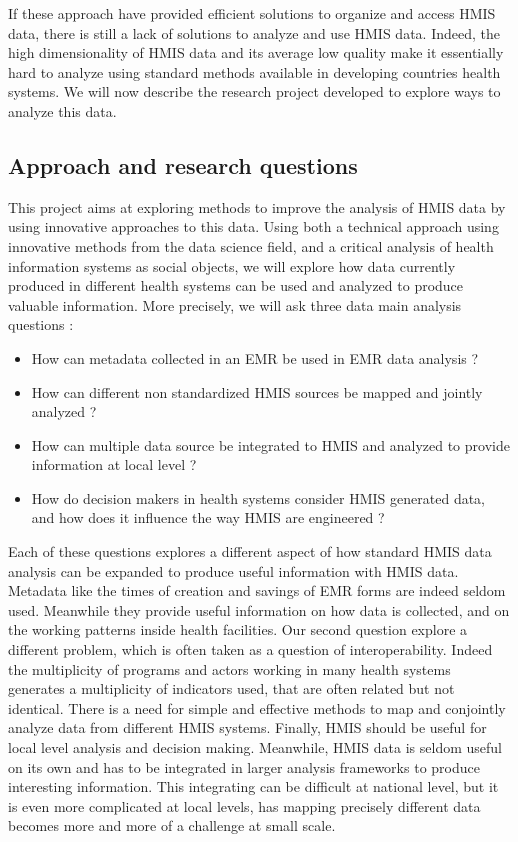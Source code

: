 \documentclass[a4paper,11pt,draft,twoside]{article}
\begin{document}
If these approach have provided efficient solutions to organize and access HMIS data, there is still a lack of solutions to analyze and use HMIS data. Indeed, the high dimensionality of HMIS data and its average low quality make it essentially hard to analyze using standard methods available in developing countries health systems. We will now describe the research project developed to explore ways to analyze this data.


\subsection{Approach and research questions}


This project aims at exploring methods to improve the analysis of HMIS data by using innovative approaches to this data. Using both a technical approach using innovative methods from the data science field, and a critical analysis of health information systems as social objects, we will explore how data currently produced in different health systems can be used and analyzed to produce valuable information. More precisely, we will ask three data main analysis questions :
\begin{itemize}
\item How can metadata collected in an EMR be used in EMR data analysis ?
\item How can different non standardized HMIS sources be mapped and jointly analyzed ?
\item How can multiple data source be integrated to HMIS and analyzed to provide information at local level ?
\item How do decision makers in health systems consider HMIS generated data, and how does it influence the way HMIS are engineered ?
\end{itemize}

Each of these questions explores a different aspect of how standard HMIS data analysis can be expanded to produce useful information with HMIS data. Metadata like the times of creation and savings of EMR forms are indeed seldom used. Meanwhile they provide useful information on how data is collected, and on the working patterns inside health facilities. Our second question explore a different problem, which is often taken as a question of interoperability. Indeed the multiplicity of programs and actors working in many health systems generates a multiplicity of indicators used, that are often related but not identical. There is a need for simple and effective methods to map and conjointly analyze data from different HMIS systems. Finally, HMIS should be useful for local level analysis and decision making. Meanwhile, HMIS data is seldom useful on its own and has to be integrated in larger analysis frameworks to produce interesting information. This integrating can be difficult at national level, but it is even more complicated at local levels, has mapping precisely different data becomes more and more of a challenge at small scale.
\end{document}
